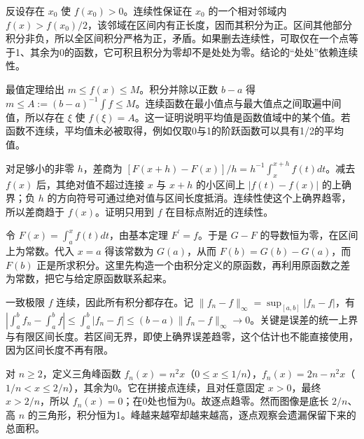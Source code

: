 \documentclass[12pt,fontset=fandol]{ctexart}
\begin{document}
\begin{solve}\label{ans:c30q6}
反设存在 $x_0$ 使 $f(x_0)>0$。连续性保证在 $x_0$ 的一个相对邻域内 $f(x)>f(x_0)/2$，该邻域在区间内有正长度，因而其积分为正。区间其他部分积分非负，所以全区间积分严格为正，矛盾。如果删去连续性，可取仅在一个点等于1、其余为0的函数，它可积且积分为零却不是处处为零。结论的“处处”依赖连续性。
\end{solve}

\begin{solve}\label{ans:c30q7}
最值定理给出 $m\le f(x)\le M$。积分并除以正数 $b-a$ 得 $m\le A:=(b-a)^{-1}\int f\le M$。连续函数在最小值点与最大值点之间取遍中间值，所以存在 $\xi$ 使 $f(\xi)=A$。这一证明说明平均值是函数值域中的某个值。若函数不连续，平均值未必被取得，例如仅取0与1的阶跃函数可以具有1/2的平均值。
\end{solve}

\begin{solve}\label{ans:c30q8}
对足够小的非零 $h$，差商为 $[F(x+h)-F(x)]/h=h^{-1}\int_x^{x+h}f(t)dt$。减去 $f(x)$ 后，其绝对值不超过连接 $x$ 与 $x+h$ 的小区间上 $|f(t)-f(x)|$ 的上确界；负 $h$ 的方向符号可通过绝对值与区间长度抵消。连续性使这个上确界趋零，所以差商趋于 $f(x)$。证明只用到 $f$ 在目标点附近的连续性。
\end{solve}

\begin{solve}\label{ans:c30q9}
令 $F(x)=\int_a^xf(t)dt$，由基本定理 $F^{\prime}=f$。于是 $G-F$ 的导数恒为零，在区间上为常数。代入 $x=a$ 得该常数为 $G(a)$，从而 $F(b)=G(b)-G(a)$，而 $F(b)$ 正是所求积分。这里先构造一个由积分定义的原函数，再利用原函数之差为常数，把它与给定原函数联系起来。
\end{solve}

\begin{solve}\label{ans:c30q10}
一致极限 $f$ 连续，因此所有积分都存在。记 $\|f_n-f\|_\infty=\sup_{[a,b]}|f_n-f|$，有 $|\int_a^bf_n-\int_a^bf|\le\int_a^b|f_n-f|\le(b-a)\|f_n-f\|_\infty\to0$。关键是误差的统一上界与有限区间长度。若区间无界，即使上确界误差趋零，这个估计也不能直接使用，因为区间长度不再有限。
\end{solve}

\begin{solve}\label{ans:c30q11}
对 $n\ge2$，定义三角峰函数 $f_n(x)=n^2x$（$0\le x\le1/n$），$f_n(x)=2n-n^2x$（$1/n<x\le2/n$），其余为0。它在拼接点连续，且对任意固定 $x>0$，最终 $x>2/n$，所以 $f_n(x)=0$；在0处也恒为0。故逐点趋零。然而图像是底长 $2/n$、高 $n$ 的三角形，积分恒为1。峰越来越窄却越来越高，逐点观察会遗漏保留下来的总面积。
\end{solve}
\end{document}
